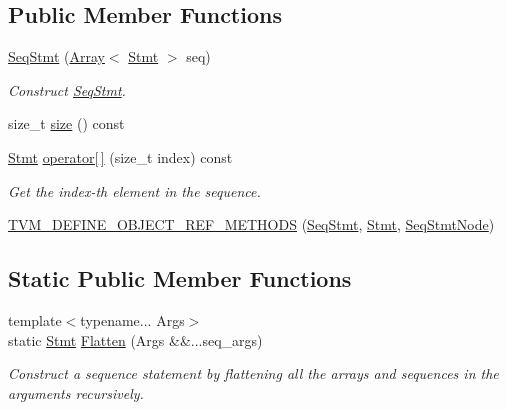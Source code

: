 \subsection*{Public Member Functions}
\begin{DoxyCompactItemize}
\item 
\hyperlink{classtvm_1_1tir_1_1SeqStmt_a195b9e5e7b1ac5e3b4369ecf0fe507ef}{Seq\+Stmt} (\hyperlink{classtvm_1_1Array}{Array}$<$ \hyperlink{classtvm_1_1tir_1_1Stmt}{Stmt} $>$ seq)
\begin{DoxyCompactList}\small\item\em Construct \hyperlink{classtvm_1_1tir_1_1SeqStmt}{Seq\+Stmt}. \end{DoxyCompactList}\item 
size\+\_\+t \hyperlink{classtvm_1_1tir_1_1SeqStmt_acef74f73785a3c87b06b5f54f04434c5}{size} () const 
\item 
\hyperlink{classtvm_1_1tir_1_1Stmt}{Stmt} \hyperlink{classtvm_1_1tir_1_1SeqStmt_a524c9780854c9957a3a1ea5f6e08a492}{operator\mbox{[}$\,$\mbox{]}} (size\+\_\+t index) const 
\begin{DoxyCompactList}\small\item\em Get the index-\/th element in the sequence. \end{DoxyCompactList}\item 
\hyperlink{classtvm_1_1tir_1_1SeqStmt_a49bd1ec442b841a84e01d7c2a1db85ea}{T\+V\+M\+\_\+\+D\+E\+F\+I\+N\+E\+\_\+\+O\+B\+J\+E\+C\+T\+\_\+\+R\+E\+F\+\_\+\+M\+E\+T\+H\+O\+DS} (\hyperlink{classtvm_1_1tir_1_1SeqStmt}{Seq\+Stmt}, \hyperlink{classtvm_1_1tir_1_1Stmt}{Stmt}, \hyperlink{classtvm_1_1tir_1_1SeqStmtNode}{Seq\+Stmt\+Node})
\end{DoxyCompactItemize}
\subsection*{Static Public Member Functions}
\begin{DoxyCompactItemize}
\item 
{\footnotesize template$<$typename... Args$>$ }\\static \hyperlink{classtvm_1_1tir_1_1Stmt}{Stmt} \hyperlink{classtvm_1_1tir_1_1SeqStmt_a89a52de7cbea6a0aea4de70cebbe220c}{Flatten} (Args \&\&...seq\+\_\+args)
\begin{DoxyCompactList}\small\item\em Construct a sequence statement by flattening all the arrays and sequences in the arguments recursively. \end{DoxyCompactList}\end{DoxyCompactItemize}


